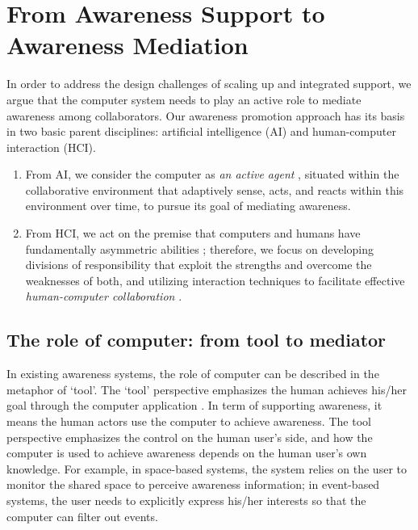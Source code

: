 \section{From Awareness Support to Awareness Mediation} %
\label{sec:from_support_to_promotion}
In order to address the design challenges of scaling up and integrated support, we argue that the computer system needs to play an active role to mediate awareness among collaborators. Our awareness promotion approach has its basis in two basic parent disciplines:  artificial intelligence (AI) and human-computer interaction (HCI). 
\begin{enumerate}
   \item From AI, we consider the computer as \emph{an active agent} \cite{Brown99activeuser}, situated within the collaborative environment that adaptively sense, acts, and reacts within this environment over time, to pursue its goal of mediating awareness.
   \item From HCI, we act on the premise that computers and humans have fundamentally asymmetric abilities \cite{Dalal1994}; therefore, we focus on developing divisions of responsibility that exploit the strengths and overcome the weaknesses of both, and utilizing interaction techniques to facilitate effective \emph{human-computer collaboration} \cite{Terveen1995}.
\end{enumerate}

\subsection{The role of computer: from tool to mediator} %
\label{sub:the_role_of_computer}
In existing awareness systems, the role of computer can be described in the metaphor of `tool'. The `tool' perspective emphasizes the human achieves his/her goal through the computer application \cite{Bodker1997}. In term of supporting awareness, it means the human actors use the computer to achieve awareness. The tool perspective emphasizes the control on the human user's side, and how the computer is used to achieve awareness depends on the human user's own knowledge. For example, in space-based systems, the system relies on the user to monitor the shared space to perceive awareness information; in event-based systems, the user needs to explicitly express his/her interests so that the computer can filter out events. 

